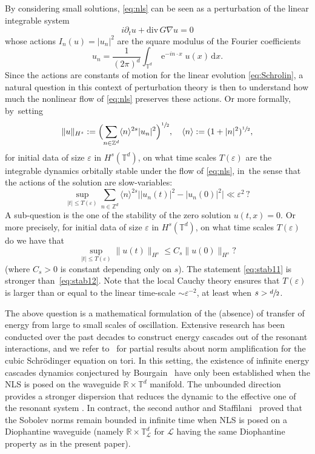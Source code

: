 \documentclass[10pt,a4paper]{amsart}
\theoremstyle{plain}
\theoremstyle{definition}
\DeclareMathOperator{\e}{e}
\newcommand{\Z}{\mathbb{Z}}
\newcommand{\R}{\mathbb{R}}
\newcommand{\T}{\mathbb{T}}
\newcommand{\1}{\mathbf{1}}
\let\epsilon\varepsilon
\begin{document}
By considering small solutions, \eqref{eq:nls} can be seen as a perturbation of the linear integrable system
\begin{equation}
\label{eq:Schrolin}
i\partial_{t}u + \mathrm{div} \, G \nabla u = 0
\end{equation}
whose actions $I_n(u) = |u_n|^2$ are the square modulus of the Fourier coefficients
\[
u_{n} = \frac{1}{(2\pi)^d}\int_{\T^{d}}\e^{-in\cdot x}u(x)\, \mathrm{d}x.
\]
Since the actions are constants of motion for the linear evolution \eqref{eq:Schrolin}, a natural question in this context of perturbation theory is then to understand how much the nonlinear flow of \eqref{eq:nls} preserves these actions. Or more formally, by~setting
\[
\|u\|_{H^{s}}:=\Bigl(\sum_{n\in\Z^{d}}\langle n\rangle^{2s}|u_{n}|^{2}\Bigr)^{\sfrac{1}{2}},\quad \langle n\rangle:= (1+|n|^{2})^{\sfrac{1}{2}},
\]
for initial data of size $\varepsilon$ in $H^{s}(\mathbb{T}^{d})$, on what time scales $T(\epsilon)$ are the integrable dynamics orbitally stable under the flow of \eqref{eq:nls}, in~the sense that the actions of the solution are slow-variables:
\begin{equation}
\label{eq:stab11}
\sup_{|t|\leq T(\epsilon)}\sum_{n\in\Z^d} \langle n\rangle^{2s}
\big|
|u_{n}(t)|^{2}
-
|u_{n}(0)|^{2}
\big| \ll \varepsilon^{2} \,?
\end{equation}
A sub-question is the one of the stability of the zero solution $u(t,x)=0$. Or more precisely, for initial data of size $\varepsilon$ in $H^{s}(\mathbb{T}^{d})$, on what time scales $T(\epsilon)$ do we have that
\begin{equation}
\label{eq:stab12}
\sup_{|t|\leq T(\epsilon)}\|u(t)\|_{H^{s}} \leq C_s\|u(0)\|_{H^{s}} ?
\end{equation}
(where $C_s>0$ is constant depending only on $s$). The statement \eqref{eq:stab11} is stronger than~\eqref{eq:stab12}. Note that the local Cauchy theory ensures that $T(\varepsilon)$ is larger than or equal to the linear time-scale $\sim\varepsilon^{-2}$, at least when $s>\sfrac{d}{2}$.

The above question is a mathematical formulation of the (absence) of transfer of energy from large to small scales of oscillation. Extensive research has been conducted over the past decades to construct energy cascades out of the resonant interactions, and we refer to~\cite{CKSTT,GG22,GK15} for partial results about norm amplification for the cubic Schrödinger equation on tori. In this setting, the existence of infinite energy cascades dynamics conjectured by Bourgain~\cite{Bourgain-conj-00} have only been established when the NLS is posed on the waveguide $\R\times\T^{d}$ manifold. The unbounded direction provides a stronger dispersion that reduces the dynamic to the effective one of the resonant system \cite{HPTV15}. In contract, the second author and Staffilani~\cite{CS24,C25} proved that the Sobolev norms remain bounded in infinite time when NLS is posed on a Diophantine waveguide (namely $\R\times\T_{\mathscr{L}}^{d}$ for $\mathscr{L}$ having the same Diophantine property as in the present paper).
\end{document}
